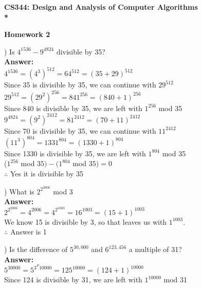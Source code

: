 \documentclass{article}
\begin{document}
\begin{center}
\bf{\LARGE CS344: Design and Analysis of Computer Algorithms} \\*

\vspace{0.2in}
{\bf {\Large Homework 2}}
\end{center}

\vspace{.2in}


\vspace{.2in}
) Is $4^{1536} - 9^{4824}$ divisible by 35? \\
\vspace{.1in}
{\bf Answer:} \\
\indent $4^{1536} = (4^3)^{512} = 64^{512} = (35 + 29)^{512}$ \\
\indent Since 35 is divisible by 35, we can continue with $29^{512}$ \\
\indent $29^{512} = (29^2)^{256} = 841^{256} = (840 + 1)^{256}$ \\
\indent Since 840 is divisible by 35, we are left with $1^{256}$ mod 35 \\

\indent $9^4824 = (9^2)^{2412} = 81^{2412} = (70 + 11)^{2412}$ \\
\indent Since 70 is divisible by 35, we can continue with $11^{2412}$ \\
\indent $(11^3)^{804} = 1331^{804} = (1330 + 1)^{804}$ \\
\indent Since 1330 is divisible by 35, we are left with $1^{804}$ mod 35 \\

\indent ($1^{256}$ mod $35) - (1^{804}$ mod $35) = 0$ \\
\indent $\therefore$ Yes it is divisible by 35

\vspace{.3in}
) What is $2^{2^{2006}}$ mod 3 \\
\vspace{.1in}
{\bf Answer:} \\
\indent $2^{2^{2006}} =  4^{2006} = 4^{2^{1003}} = 16^{1003 } = (15 + 1)^{1003}$ \\
\indent We know 15 is divisible by 3, so that leaves us with $1^{1003}$. \\
\indent $\therefore$ Answer is 1

\vspace{.3in}
) Is the difference of $5^{30,000}$ and $6^{123,456}$ a multiple of 31? \\
\vspace{.1in}
{\bf Answer:} \\
\indent $5^{30000} = 5^{3^P{10000}} = 125^{10000} = (124 + 1)^{10000}$ \\
\indent Since 124 is divisible by 31, we are left with $1^{10000} $ mod 31 \\
\end{document}
